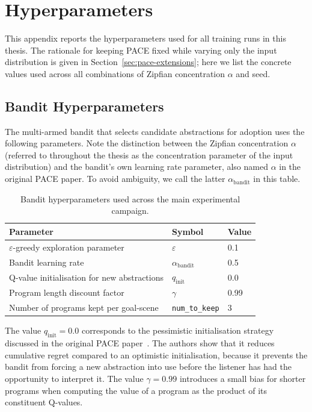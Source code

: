 \chapter{Hyperparameters}\label{ch:apdb}


This appendix reports the hyperparameters used for all training runs in this thesis. The rationale for keeping PACE fixed while varying only the input distribution is given in Section~\ref{sec:pace-extensions}; here we list the concrete values used across all combinations of Zipfian concentration $\alpha$ and seed.

\section{Bandit Hyperparameters}
\label{sec:appendix-bandit-hyperparameters}

The multi-armed bandit that selects candidate abstractions for adoption uses the following parameters. Note the distinction between the Zipfian concentration $\alpha$ (referred to throughout the thesis as the concentration parameter of the input distribution) and the bandit's own learning rate parameter, also named $\alpha$ in the original PACE paper. To avoid ambiguity, we call the latter $\alpha_{\text{bandit}}$ in this table.

\begin{table}[htbp]
\centering
\begin{tabular}{lll}
\toprule
Parameter & Symbol & Value \\
\midrule
$\varepsilon$-greedy exploration parameter & $\varepsilon$ & 0.1 \\
Bandit learning rate & $\alpha_{\text{bandit}}$ & 0.5 \\
Q-value initialisation for new abstractions & $q_{\text{init}}$\footnotemark & 0.0 \\
Program length discount factor & $\gamma$ & 0.99 \\
Number of programs kept per goal-scene & \texttt{num\_to\_keep} & 3 \\
\bottomrule
\end{tabular}
\caption{Bandit hyperparameters used across the main experimental campaign.}
\label{tab:bandit-hyperparameters}
\end{table}

The value $q_{\text{init}} = 0.0$ corresponds to the pessimistic initialisation strategy discussed in the original PACE paper~\cite{thomas_pace_2025}. The authors show that it reduces cumulative regret compared to an optimistic initialisation, because it prevents the bandit from forcing a new abstraction into use before the listener has had the opportunity to interpret it. The value $\gamma = 0.99$ introduces a small bias for shorter programs when computing the value of a program as the product of its constituent Q-values.

